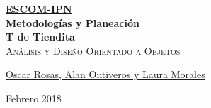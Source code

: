\documentclass[12pt, fleqn]{report}                             %
\author{Oscar Rosas, Alan Ontiveros y Laura Morales}            %
\theoremstyle{break}                                            %
\begin{document}
\begin{titlepage}
    
    \pagecolor{TitlePageColor}                                      %
    \color{white}                                                   %

    \vspace                                                         %
    \baselineskip                                                   %

    \makebox[0pt][l]{\rule{1.3\textwidth}{3pt}}                     %
    
    \href{https://compilandoconocimiento.com}                       %
    {\textbf{\textsc{\Huge ESCOM-IPN}}}\\[2.7cm]                    %

    \href{\ProjectNameLink/LibroProbabilidad}                       %
    {\fontsize{36}{50}                                              %
        \selectfont \textbf{Metodologías y Planeación}}\\[0.5cm]       %
    {\fontsize{36}{50}                                              %
        \selectfont \textbf{T de Tiendita}}\\[0.5cm]                %
    \textcolor{ColorSubtext}                                        %
        {\textsc{\LARGE Análisis y Diseño Orientado a Objetos}}     %
    
    \vfill                                                          %
    
    \href{https://compilandoconocimiento.com/yo}                    %
    {\LARGE \textsf{Oscar Rosas, Alan Ontiveros y Laura Morales}}   %

    \vspace                                                         %
    \baselineskip                                                   %
    
    {\large \textsf{Febrero 2018}}                                  %

\end{titlepage}
\end{document}
